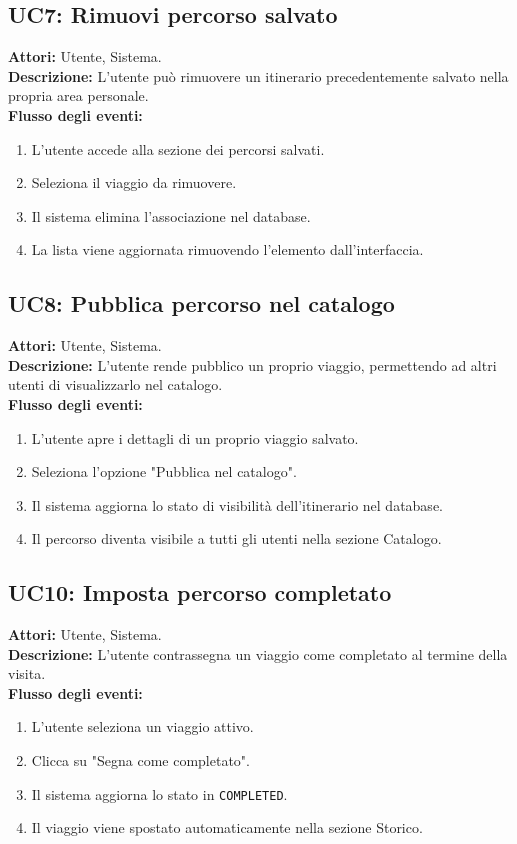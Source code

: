 \subsection*{UC7: Rimuovi percorso salvato}
\textbf{Attori:} Utente, Sistema.\\
\textbf{Descrizione:} L'utente può rimuovere un itinerario precedentemente salvato nella propria area personale.\\
\textbf{Flusso degli eventi:}
\begin{enumerate}
    \item L'utente accede alla sezione dei percorsi salvati.
    \item Seleziona il viaggio da rimuovere.
    \item Il sistema elimina l'associazione nel database.
    \item La lista viene aggiornata rimuovendo l'elemento dall'interfaccia.
\end{enumerate}

\subsection*{UC8: Pubblica percorso nel catalogo}
\textbf{Attori:} Utente, Sistema.\\
\textbf{Descrizione:} L'utente rende pubblico un proprio viaggio, permettendo ad altri utenti di visualizzarlo nel catalogo.\\
\textbf{Flusso degli eventi:}
\begin{enumerate}
    \item L'utente apre i dettagli di un proprio viaggio salvato.
    \item Seleziona l'opzione "Pubblica nel catalogo".
    \item Il sistema aggiorna lo stato di visibilità dell'itinerario nel database.
    \item Il percorso diventa visibile a tutti gli utenti nella sezione Catalogo.
\end{enumerate}

\subsection*{UC10: Imposta percorso completato}
\textbf{Attori:} Utente, Sistema.\\
\textbf{Descrizione:} L'utente contrassegna un viaggio come completato al termine della visita.\\
\textbf{Flusso degli eventi:}
\begin{enumerate}
    \item L'utente seleziona un viaggio attivo.
    \item Clicca su "Segna come completato".
    \item Il sistema aggiorna lo stato in \texttt{COMPLETED}.
    \item Il viaggio viene spostato automaticamente nella sezione Storico.
\end{enumerate}


